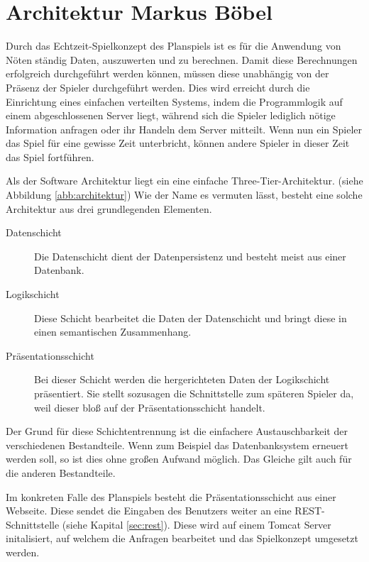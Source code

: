 \section{Architektur \textnormal{\textsf{\small{Markus Böbel}}}}

Durch das Echtzeit-Spielkonzept des Planspiels ist es für die Anwendung von Nöten ständig Daten, auszuwerten und zu berechnen. Damit diese Berechnungen erfolgreich durchgeführt werden können, müssen diese unabhängig von der Präsenz der Spieler durchgeführt werden. Dies wird erreicht durch die Einrichtung eines einfachen verteilten Systems, indem die Programmlogik auf einem abgeschlossenen Server liegt, während sich die Spieler lediglich nötige Information anfragen oder ihr Handeln dem Server mitteilt.
Wenn nun ein Spieler das Spiel für eine gewisse Zeit unterbricht, können andere Spieler in dieser Zeit das Spiel fortführen.

Als der Software Architektur liegt ein eine einfache Three-Tier-Architektur. (siehe Abbildung \ref{abb:architektur})
Wie der Name es vermuten lässt, besteht eine solche Architektur aus drei grundlegenden Elementen.

\begin{description}
	\item[Datenschicht] Die Datenschicht dient der Datenpersistenz und besteht meist aus einer Datenbank.
	\item[Logikschicht] Diese Schicht bearbeitet die Daten der Datenschicht und bringt diese in einen semantischen Zusammenhang. 
	\item[Präsentationsschicht] Bei dieser Schicht werden die hergerichteten Daten der Logikschicht präsentiert. Sie stellt sozusagen die Schnittstelle zum späteren Spieler da, weil dieser bloß auf der Präsentationsschicht handelt.
\end{description}
Der Grund für diese Schichtentrennung ist die einfachere Austauschbarkeit der verschiedenen Bestandteile. Wenn zum Beispiel das Datenbanksystem erneuert werden soll, so ist dies ohne großen Aufwand möglich. Das Gleiche gilt auch für die anderen Bestandteile.

Im konkreten Falle des Planspiels besteht die Präsentationsschicht aus einer Webseite. Diese sendet die Eingaben des Benutzers weiter an eine REST-Schnittstelle (siehe Kapital \ref{sec:rest}). Diese wird auf einem Tomcat Server initalisiert, auf welchem die Anfragen bearbeitet und das Spielkonzept umgesetzt werden.


